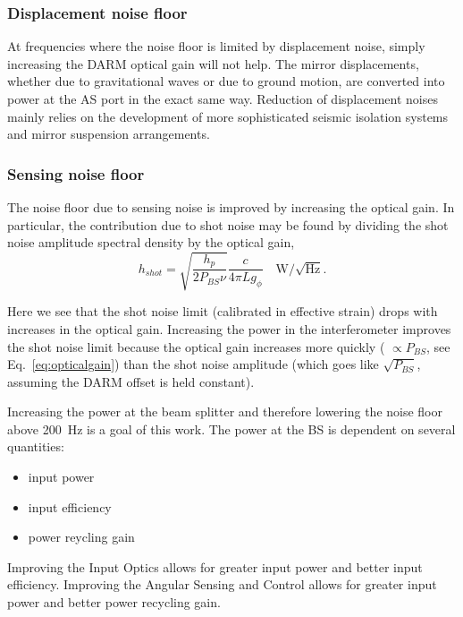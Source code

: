 \subsubsection{Displacement noise floor} 
At frequencies where the noise floor is limited by displacement noise,
simply increasing the DARM optical gain will not help. The mirror
displacements, whether due to gravitational waves or due to ground
motion, are converted into power at the AS port in the exact same
way.   Reduction of displacement noises mainly relies on the development
of more sophisticated seismic isolation systems and mirror suspension
arrangements.


\subsubsection{Sensing noise floor}
The noise floor due to sensing noise is improved by increasing the
optical gain. 
In particular, the contribution due to shot noise  may be found by 
dividing the shot noise amplitude spectral density by the optical gain,
\begin{equation}
h_{shot} = \sqrt{\frac{h_p}{2 P_{BS} \nu}} \frac{c}{4 \pi L g_{\phi}}
\quad \text{W}/\sqrt{\text{Hz}}.
\label{eq:SNL}
\end{equation}

Here we see that the shot noise limit (calibrated in effective strain)
drops with increases in the optical gain. 
Increasing the power in the interferometer improves the shot noise limit
because the optical gain increases more quickly ( $\propto
P_{BS}$, see Eq.~\ref{eq:opticalgain}) than the shot noise amplitude
(which goes like $\sqrt{P_{BS}}$, assuming the DARM offset is held
constant).

Increasing the power at the beam splitter and therefore lowering the
noise floor above 200~Hz is a goal of this work. The power at the BS
is dependent on several quantities:
\begin{itemize}
\item input power \vspace{-10 pt}
\item input efficiency \vspace{-10 pt}
\item power reycling gain
\end{itemize}
Improving the Input Optics allows for greater input power and better
input efficiency. Improving the Angular Sensing and Control allows for
greater input power and better power recycling gain.



